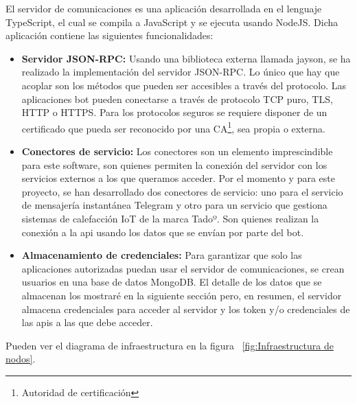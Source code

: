 \documentclass[spanish,12pt, a4paper, twoside]{paper}
\begin{document}
El servidor de comunicaciones es una aplicación desarrollada en el lenguaje TypeScript, el cual se compila a JavaScript y se ejecuta usando NodeJS. Dicha aplicación contiene las siguientes funcionalidades:

\begin{itemize}
\item \textbf{Servidor JSON-RPC:} Usando una biblioteca externa llamada jayson, se ha realizado la implementación del servidor JSON-RPC. Lo único que hay que acoplar son los métodos que pueden ser accesibles a través del protocolo. Las aplicaciones bot pueden conectarse a través de protocolo TCP puro, TLS, HTTP o HTTPS. Para los protocolos seguros se requiere disponer de un certificado que pueda ser reconocido por una CA\footnote{Autoridad de certificación}, sea propia o externa.

\item \textbf{Conectores de servicio:} Los conectores son un elemento imprescindible para este software, son quienes permiten la conexión del servidor con los servicios externos a los que queramos acceder. Por el momento y para este proyecto, se han desarrollado dos conectores de servicio: uno para el servicio de mensajería instantánea Telegram y otro para un servicio que gestiona sistemas de calefacción IoT de la marca Tadoº. Son quienes realizan la conexión a la api usando los datos que se envían por parte del bot.

\item \textbf{Almacenamiento de credenciales:} Para garantizar que solo las aplicaciones autorizadas puedan usar el servidor de comunicaciones, se crean usuarios en una base de datos MongoDB. El detalle de los datos que se almacenan los mostraré en la siguiente sección pero, en resumen, el servidor almacena credenciales para acceder al servidor y los token y/o credenciales de las apis a las que debe acceder.
\end{itemize}

Pueden ver el diagrama de infraestructura en la figura ~\ref{fig:Infraestructura de nodos}.
\end{document}
